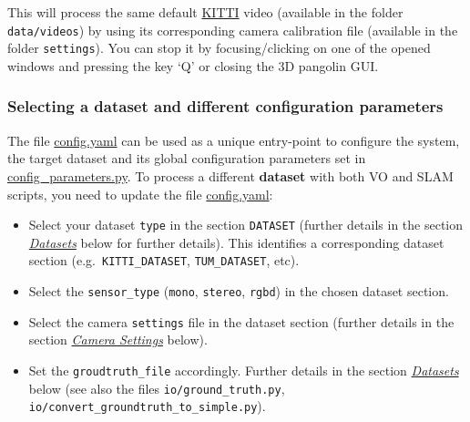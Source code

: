 \documentclass{article}
\newenvironment{Shaded}{\begin{snugshade}}{\end{snugshade}}
\newcommand{\BuiltInTok}[1]{\textcolor[rgb]{0.74,0.68,0.62}{#1}}
\newcommand{\CommentTok}[1]{\textcolor[rgb]{0.00,0.40,1.00}{\textbf{\textit{#1}}}}
\newcommand{\ExtensionTok}[1]{\textcolor[rgb]{0.74,0.68,0.62}{#1}}
\newcommand{\NormalTok}[1]{\textcolor[rgb]{0.74,0.68,0.62}{#1}}
\begin{document}
\begin{scriptsize}
\begin{Shaded}
\end{Shaded}
\end{scriptsize}

This will process the same default
\href{(http://www.cvlibs.net/datasets/kitti/eval_odometry.php)}{KITTI}
video (available in the folder \texttt{data/videos}) by using its
corresponding camera calibration file (available in the folder
\texttt{settings}). You can stop it by focusing/clicking on one of the
opened windows and pressing the key `Q' or closing the 3D pangolin GUI.
\hypertarget{selecting-a-dataset-and-different-configuration-parameters}{%
\subsubsection{Selecting a dataset and different configuration
parameters}\label{selecting-a-dataset-and-different-configuration-parameters}}

The file \href{./config.yaml}{config.yaml} can be used as a unique
entry-point to configure the system, the target dataset and its global
configuration parameters set in
\href{./config_parameters.py}{config\_parameters.py}.
To process a different \textbf{dataset} with both VO and SLAM scripts,
you need to update the file \href{./config.yaml}{config.yaml}:
\begin{itemize}
\item Select
your dataset \texttt{type} in the section \texttt{DATASET} (further
details in the section \emph{\protect\hyperlink{datasets}{Datasets}}
below for further details). This identifies a corresponding dataset
section (e.g.~\texttt{KITTI\_DATASET}, \texttt{TUM\_DATASET}, etc). 
\item  Select the \texttt{sensor\_type} (\texttt{mono}, \texttt{stereo},
\texttt{rgbd}) in the chosen dataset section.
\item  Select the camera \texttt{settings} file in the dataset section
(further details in the section
\emph{\protect\hyperlink{camera-settings}{Camera Settings}} below).
\item Set the \texttt{groudtruth\_file} accordingly. Further details in the
section \emph{\protect\hyperlink{datasets}{Datasets}} below (see also
the files \texttt{io/ground\_truth.py},
\texttt{io/convert\_groundtruth\_to\_simple.py}).
\end{itemize}
\end{document}
